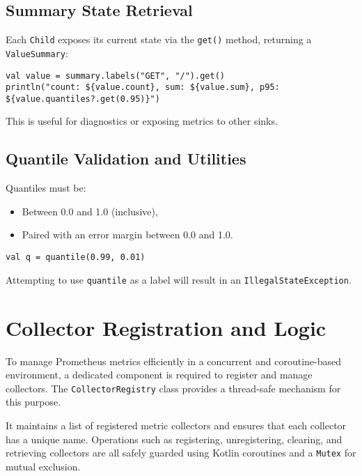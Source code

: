 \subsection{Summary State Retrieval}

Each \texttt{Child} exposes its current state via the \texttt{get()} method, returning a \texttt{ValueSummary}:

\begin{verbatim}
val value = summary.labels("GET", "/").get()
println("count: ${value.count}, sum: ${value.sum}, p95: ${value.quantiles?.get(0.95)}")
\end{verbatim}

This is useful for diagnostics or exposing metrics to other sinks.

\subsection{Quantile Validation and Utilities}

Quantiles must be:
\begin{itemize}
\item Between 0.0 and 1.0 (inclusive),
\item Paired with an error margin between 0.0 and 1.0.
\end{itemize}

\begin{verbatim}
val q = quantile(0.99, 0.01)
\end{verbatim}

Attempting to use \texttt{quantile} as a label will result in an \texttt{IllegalStateException}.


\section{Collector Registration and Logic}

To manage Prometheus metrics efficiently in a concurrent and coroutine-based environment, a dedicated component is required to register and manage collectors. The \texttt{CollectorRegistry} class provides a thread-safe mechanism for this purpose.

It maintains a list of registered metric collectors and ensures that each collector has a unique name. Operations such as registering, unregistering, clearing, and retrieving collectors are all safely guarded using Kotlin coroutines and a \texttt{Mutex} for mutual exclusion.

